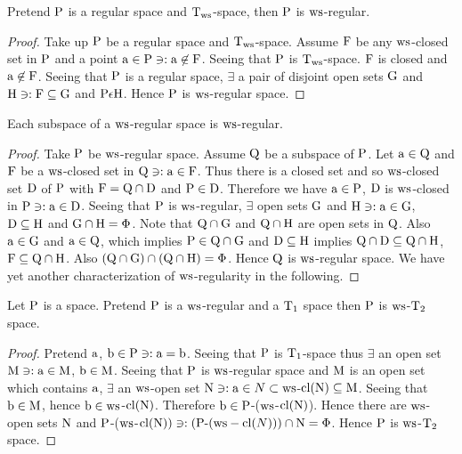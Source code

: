 \begin{thm}\label{thm8.3.3}
Pretend $\mathrm{P}$ is a regular space and $\mathrm{T}_{\mathrm{ws}}$-space, then $\mathrm{P}$ is $\mathrm{ws}$-regular.
\end{thm}

\begin{proof}
Take up $\mathrm{P}$ be a regular space and $\mathrm{T}_{\mathrm{ws}}$-space. Assume $\mathrm{F}$ be any $\mathrm{ws}$-closed set in $\mathrm{P}$ and a point $\mathrm{a} \in \mathrm{P} \ni: \mathrm{a}\not\in \mathrm{F}$. Seeing that $\mathrm{P}$ is $\mathrm{T}_{\mathrm{ws}}$-space. $\mathrm{F}$ is closed and $\mathrm{a} \not\in \mathrm{F}$. Seeing that $\mathrm{P}$ is a regular space, $\exists$ a pair of disjoint open sets $\mathrm{G}$ and $\mathrm{H} \ni: \mathrm{F} \subseteq \mathrm{G}$ and $\mathrm{P} \epsilon \mathrm{H}$. Hence $\mathrm{P}$ is $\mathrm{ws}$-regular space.
\end{proof}

\begin{thm}\label{thm8.3.4}
Each subspace of a $\mathrm{ws}$-regular space is $\mathrm{ws}$-regular.
\end{thm}

\begin{proof}
Take $\mathrm{P}$ be $\mathrm{ws}$-regular space. Assume $\mathrm{Q}$ be a subspace of $\mathrm{P}$. Let $\mathrm{a} \in \mathrm{Q}$ and $\mathrm{F}$ be a $\mathrm{ws}$-closed set in $\mathrm{Q} \ni: \mathrm{a} \in \mathrm{F}$. Thus there is a closed set and so $\mathrm{ws}$-closed set $\mathrm{D}$ of $\mathrm{P}$ with $\mathrm{F} = \mathrm{Q} \cap \mathrm{D}$ and $\mathrm{P} \in \mathrm{D}$. Therefore we have $\mathrm{a} \in \mathrm{P}$, $\mathrm{D}$ is $\mathrm{ws}$-closed in $\mathrm{P} \ni: \mathrm{a} \in \mathrm{D}$. Seeing that $\mathrm{P}$ is $\mathrm{ws}$-regular, $\exists$  open sets $\mathrm{G}$ and $\mathrm{H} \ni: \mathrm{a} \in \mathrm{G}$, $\mathrm{D}\subseteq \mathrm{H}$ and $\mathrm{G} \cap \mathrm{H} = \Phi$. Note that $\mathrm{Q} \cap \mathrm{G}$ and $\mathrm{Q} \cap \mathrm{H}$ are open sets in $\mathrm{Q}$. Also $\mathrm{a} \in \mathrm{G}$ and $\mathrm{a} \in \mathrm{Q}$, which implies $\mathrm{P} \in \mathrm{Q} \cap \mathrm{G}$ and $\mathrm{D} \subseteq \mathrm{H}$ implies $\mathrm{Q} \cap \mathrm{D} \subseteq \mathrm{Q} \cap \mathrm{H}$, $\mathrm{F} \subseteq \mathrm{Q} \cap \mathrm{H}$. Also $(\mathrm{Q} \cap \mathrm{G}) \cap (\mathrm{Q} \cap \mathrm{H}) = \Phi$. Hence $\mathrm{Q}$ is $\mathrm{ws}$-regular space. We have yet another characterization of $\mathrm{ws}$-regularity in the following.
\end{proof}

\begin{thm}\label{thm8.3.5}
Let $\mathrm{P}$ is a space. Pretend $\mathrm{P}$ is a $\mathrm{ws}$-regular and a $\mathrm{T}_{1}$ space then $\mathrm{P}$ is $\mathrm{ws}$-$\mathrm{T}_{2}$ space.
\end{thm}

\begin{proof}
Pretend $\mathrm{a}$, $\mathrm{b} \in \mathrm{P} \ni: \mathrm{a} = \mathrm{b}$. Seeing that $\mathrm{P}$ is $\mathrm{T}_{1}$-space thus $\exists$ an open set $\mathrm{M} \ni:\mathrm{a} \in \mathrm{M}$, $\mathrm{b} \in \mathrm{M}$. Seeing that $\mathrm{P}$ is $\mathrm{ws}$-regular space and $\mathrm{M}$ is an open set which contains $\mathrm{a}$, $\exists$  an $\mathrm{ws}$-open set $\mathrm{N} \ni: \mathrm{a}\in N\subset \mathrm{ws}$-$\mathrm{cl}(\mathrm{N}) \subseteq \mathrm{M}$. Seeing that $\mathrm{b} \in \mathrm{M}$, hence $\mathrm{b} \in \mathrm{ws}$-$\mathrm{cl}(\mathrm{N})$. Therefore $\mathrm{b} \in \mathrm{P}$-($\mathrm{ws}$-$\mathrm{cl}(\mathrm{N})$). Hence there are $\mathrm{ws}$-open sets $\mathrm{N}$ and $\mathrm{P}$-($\mathrm{ws}$-$\mathrm{cl}(\mathrm{N})) \ni:(\mathrm{P}\text{-}(\mathrm{ws}-\mathrm{cl}(N)))\cap \mathrm{N} = \Phi$. Hence $\mathrm{P}$ is $\mathrm{ws}$-$\mathrm{T}_{2}$ space.
\end{proof}

